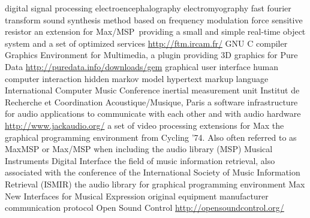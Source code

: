  digital signal processing
 electroencephalography
 electromyography
 fast fourier transform
 sound synthesis method based on frequency modulation
 force sensitive resistor
 an extension for Max/MSP providing a small and simple real-time object system and a set of optimized services  \url{http://ftm.ircam.fr/}
 GNU C compiler %
 Graphics Environment for Multimedia, a plugin providing 3D graphics for Pure Data  \url{http://puredata.info/downloads/gem}
 graphical user interface
 human computer interaction
 hidden markov model
 hypertext markup language
 International Computer Music Conference %
 inertial measurement unit
 Institut de Recherche et Coordination Acoustique/Musique, Paris %
 a software infrastructure for audio applications to communicate with each other and with audio hardware  \url{http://www.jackaudio.org/}
 a set of video processing extensions for Max
 the graphical programming environment from Cycling '74. Also often referred to as MaxMSP or Max/MSP when including the audio library (MSP)
 Musical Instruments Digital Interface
 the field of music information retrieval, also associated with the conference of the International Society of Music Information Retrieval (ISMIR)
 the audio library for graphical programming environment Max
 New Interfaces for Musical Expression %
 original equipment manufacturer
 communication protocol Open Sound Control   \url{http://opensoundcontrol.org/}
